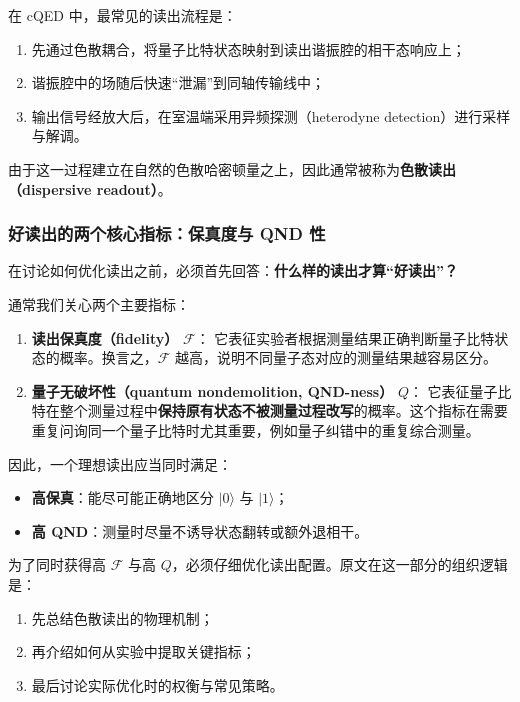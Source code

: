 \documentclass[12pt,a4paper,oneside]{ctexbook}
\begin{document}
在 cQED 中，最常见的读出流程是：
\begin{enumerate}
    \item 先通过色散耦合，将量子比特状态映射到读出谐振腔的相干态响应上；
    \item 谐振腔中的场随后快速“泄漏”到同轴传输线中；
    \item 输出信号经放大后，在室温端采用异频探测（heterodyne detection）进行采样与解调。
\end{enumerate}

由于这一过程建立在自然的色散哈密顿量之上，因此通常被称为\textbf{色散读出（dispersive readout）}。

\subsubsection{好读出的两个核心指标：保真度与 QND 性}

在讨论如何优化读出之前，必须首先回答：\textbf{什么样的读出才算“好读出”？}

通常我们关心两个主要指标：

\begin{enumerate}
    \item \textbf{读出保真度（fidelity）} \(\mathcal{F}\)：
    它表征实验者根据测量结果正确判断量子比特状态的概率。换言之，\(\mathcal{F}\) 越高，说明不同量子态对应的测量结果越容易区分。

    \item \textbf{量子无破坏性（quantum nondemolition, QND-ness）} \(Q\)：
    它表征量子比特在整个测量过程中\textbf{保持原有状态不被测量过程改写}的概率。这个指标在需要重复问询同一个量子比特时尤其重要，例如量子纠错中的重复综合测量。
\end{enumerate}

因此，一个理想读出应当同时满足：
\begin{itemize}
    \item \textbf{高保真}：能尽可能正确地区分 \(|0\rangle\) 与 \(|1\rangle\)；
    \item \textbf{高 QND}：测量时尽量不诱导状态翻转或额外退相干。
\end{itemize}

为了同时获得高 \(\mathcal{F}\) 与高 \(Q\)，必须仔细优化读出配置。原文在这一部分的组织逻辑是：
\begin{enumerate}
    \item 先总结色散读出的物理机制；
    \item 再介绍如何从实验中提取关键指标；
    \item 最后讨论实际优化时的权衡与常见策略。
\end{enumerate}
\end{document}
